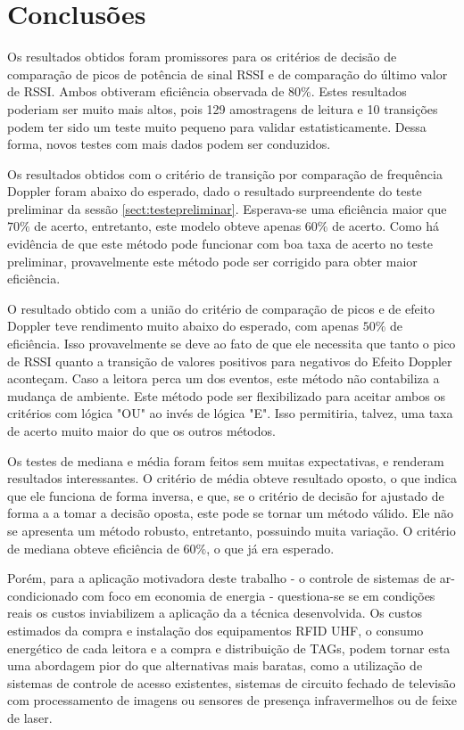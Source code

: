 
\chapter{Conclusões}

\label{CapConclusoes}

Os resultados obtidos foram promissores para os critérios de decisão de comparação de picos de potência de sinal RSSI e de comparação do último valor de RSSI. Ambos obtiveram eficiência observada de $80\%$. Estes resultados poderiam ser muito mais altos, pois 129 amostragens de leitura e 10 transições podem ter sido um teste muito pequeno para validar estatisticamente. Dessa forma, novos testes com mais dados podem ser conduzidos.

Os resultados obtidos com o critério de transição por comparação de frequência Doppler foram abaixo do esperado, dado o resultado surpreendente do teste preliminar da sessão \ref{sect:testepreliminar}. Esperava-se uma eficiência maior que $70\%$ de acerto, entretanto, este modelo obteve apenas $60\%$ de acerto. Como há evidência de que este método pode funcionar com boa taxa de acerto no teste preliminar, provavelmente este método pode ser corrigido para obter maior eficiência.

O resultado obtido com a união do critério de comparação de picos e de efeito Doppler teve rendimento muito abaixo do esperado, com apenas $50\%$ de eficiência. Isso provavelmente se deve ao fato de que ele necessita que tanto o pico de RSSI quanto a transição de valores positivos para negativos do Efeito Doppler aconteçam. Caso a leitora perca um dos eventos, este método não contabiliza a mudança de ambiente. Este método pode ser flexibilizado para aceitar ambos os critérios com lógica "OU" ao invés de lógica "E". Isso permitiria, talvez, uma taxa de acerto muito maior do que os outros métodos.

Os testes de mediana e média foram feitos sem muitas expectativas, e renderam resultados interessantes. O critério de média obteve resultado oposto, o que indica que ele funciona de forma inversa, e que, se o critério de decisão for ajustado de forma a a tomar a decisão oposta, este pode se tornar um método válido. Ele não se apresenta um método robusto, entretanto, possuindo muita variação. O critério de mediana obteve eficiência de $60\%$, o que já era esperado.

Porém, para a aplicação motivadora deste trabalho - o controle de sistemas de ar-condicionado com foco em economia de energia - questiona-se se em condições reais os custos inviabilizem a aplicação da a técnica desenvolvida. Os custos estimados da compra e instalação dos equipamentos RFID UHF, o consumo energético de cada leitora e a compra e distribuição de TAGs, podem tornar esta uma abordagem pior do que alternativas mais baratas, como a utilização de sistemas de controle de acesso existentes, sistemas de circuito fechado de televisão com processamento de imagens ou sensores de presença infravermelhos ou de feixe de laser.

